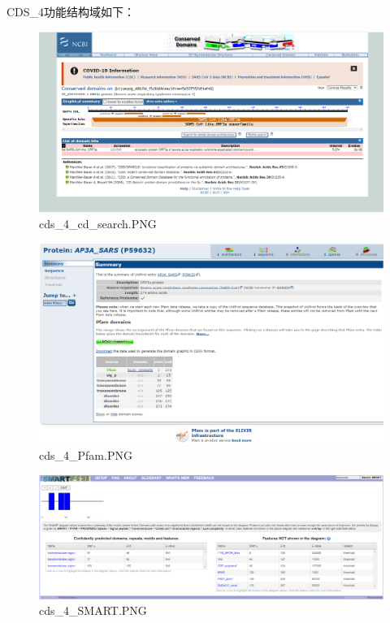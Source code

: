 \documentclass[supercite]{HustGraduPaper}
\begin{document}
	\paragraph{}\label{subpara:subpara}CDS\_4功能结构域如下：
	\begin{figure}[H]
		\centering
		\includegraphics[width=1\textwidth]{./material/practice2/cds_4/cd_search.png}
		\caption{cds\_4\_cd\_search.PNG}
	\end{figure}
	\begin{figure}[H]
		\centering
		\includegraphics[width=1\textwidth]{./material/practice2/cds_4/Pfam.png}
		\caption{cds\_4\_Pfam.PNG}
	\end{figure}
	\begin{figure}[H]
		\centering
		\includegraphics[width=1\textwidth]{./material/practice2/cds_4/SMART.png}
		\caption{cds\_4\_SMART.PNG}
	\end{figure}
\end{document}
